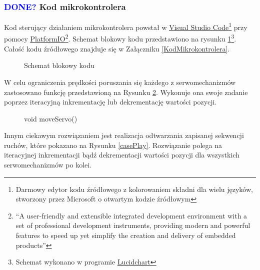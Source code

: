 \documentclass[11pt,titlepage,a4paper]{article}
\begin{document}
\newpage

\subsubsection{\textcolor{blue}{DONE?} Kod mikrokontrolera}

Kod sterujący działaniem mikrokontrolera powstał w \href{https://code.visualstudio.com}{\underline{Visual Studio Code}}\footnote{Darmowy edytor kodu źródłowego z kolorowaniem składni dla wielu języków, stworzony przez Microsoft o otwartym kodzie źródłowym} przy pomocy \href{https://platformio.org}{\underline{PlatformIO}}\footnote{\enquote{A user-friendly and extensible integrated development environment with a set of professional development instruments, providing modern and powerful features to speed up yet simplify the creation and delivery of embedded products}\cite{platformio}}. Schemat blokowy kodu przedstawiono na rysunku \ref{SBCode}\footnote{Schemat wykonano w programie \href{https://www.lucidchart.com}{\underline{Lucidchart}}}. Całość kodu źródłowego znajduje się w Załączniku \ref{KodMikrokontrolera}.

\vspace{1cm}

\begin{figure}[h!]
    \begin{center}
        
    \end{center}
    \caption{Schemat blokowy kodu}
    \label{SBCode}
\end{figure}

W celu ograniczenia prędkości poruszania się każdego z serwomechanizmów zastosowano funkcję przedstawioną na Rysunku \ref{void_moveServo}. Wykonuje ona swoje zadanie poprzez iteracyjną inkrementację lub dekrementację wartości pozycji.

\vspace{1cm}

\begin{figure}[h!]
    
    \caption{void moveServo()}
    \label{void_moveServo}
\end{figure}

\newpage

Innym ciekawym rozwiązaniem jest realizacja odtwarzania zapisanej sekwencji ruchów, które pokazano na Rysunku \ref{casePlay}. Rozwiązanie polega na iteracyjnej inkrementacji bądź dekrementacji wartości pozycji dla wszystkich serwomechanizmów po kolei.
\end{document}
